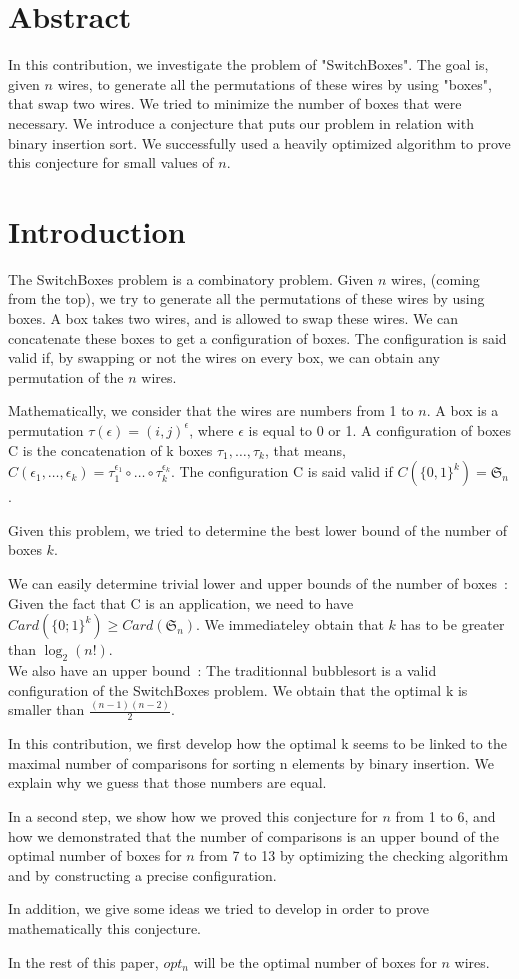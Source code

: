 \documentclass[11pt, a4paper]{article}
\begin{document}
\section{Abstract}
In this contribution, we investigate the problem of "SwitchBoxes".
The goal is, given $n$ wires, to generate all the permutations of these wires by using "boxes",
 that swap two wires. We tried to minimize the number of boxes that were necessary.
We introduce a conjecture that puts our problem in relation with binary insertion sort. 
We successfully used a heavily optimized algorithm to prove this conjecture for small values of $n$.

\section{Introduction}
The SwitchBoxes problem is a combinatory problem. Given $n$ wires, (coming from the top), 
we try to generate all the permutations of these wires by using boxes. 
A box takes two wires, and is allowed to swap these wires. We can concatenate these boxes to get a configuration of boxes.
The configuration is said valid if, by swapping or not the wires on every box, we can obtain any permutation of the $n$ wires.

Mathematically, we consider that the wires are numbers from 1 to $n$. A box is a permutation $\tau(\epsilon) = (i,j)^{\epsilon}$, where $\epsilon$ is equal to 0 or 1.
A configuration of boxes C is the concatenation of k boxes $\tau_1, \ldots, \tau_k$, that means, $C(\epsilon_1, \ldots, \epsilon_k) = \tau_1^{\epsilon_1}\circ\ldots\circ\tau_k^{\epsilon_k}$.
The configuration C is said valid if $C(\{0,1\}^k)= \mathfrak{S}_n$.

Given this problem, we tried to determine the best lower bound of the number of boxes $k$.

We can easily determine trivial lower and upper bounds of the number of boxes~:\\
Given the fact that C is an application, we need to have $Card(\{0;1\}^{k}) \geq Card(\mathfrak{S}_n)$. We immediateley obtain that $k$ has to be greater than $\log_2(n!)$.\\
We also have an upper bound~:
The traditionnal bubblesort is a valid configuration of the SwitchBoxes problem. We obtain that the optimal k is smaller than $\frac{(n-1)(n-2)}{2}$.

In this contribution, we first develop how the optimal k seems to be linked to the maximal number of comparisons for sorting n elements by binary insertion.
We explain why we guess that those numbers are equal.

In a second step, we show how we proved this conjecture for $n$ from 1 to 6, and how we demonstrated that the number of comparisons is an upper bound of the optimal number of boxes 
for $n$ from 7 to 13 by optimizing the checking algorithm and by constructing a precise configuration.

In addition, we give some ideas we tried to develop in order to prove mathematically this conjecture.

In the rest of this paper, $opt_n$ will be the optimal number of boxes for $n$ wires.
\end{document}
